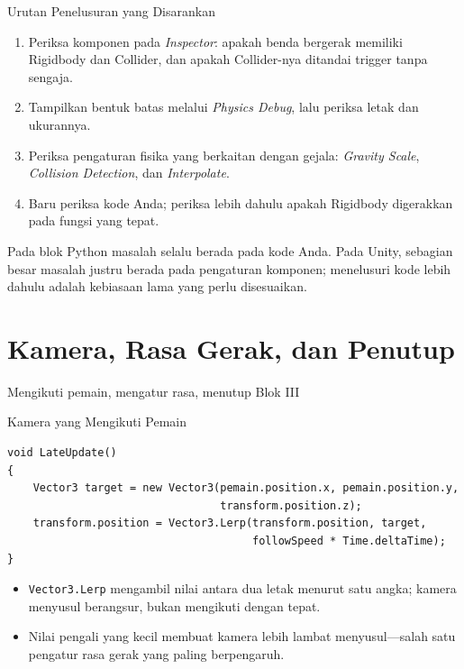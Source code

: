\documentclass[aspectratio=169,10pt]{beamer}
\begin{document}
\begin{frame}{Urutan Penelusuran yang Disarankan}
\begin{enumerate}
  \item Periksa komponen pada \emph{Inspector}: apakah benda bergerak memiliki
        Rigidbody dan Collider, dan apakah Collider-nya ditandai trigger tanpa
        sengaja.
  \item Tampilkan bentuk batas melalui \emph{Physics Debug}, lalu periksa letak
        dan ukurannya.
  \item Periksa pengaturan fisika yang berkaitan dengan gejala:
        \emph{Gravity Scale}, \emph{Collision Detection}, dan
        \emph{Interpolate}.
  \item Baru periksa kode Anda; periksa lebih dahulu apakah Rigidbody digerakkan
        pada fungsi yang tepat.
\end{enumerate}
\vspace{0.10cm}
\begin{peringatan}
Pada blok Python masalah selalu berada pada kode Anda. Pada Unity, sebagian
besar masalah justru berada pada pengaturan komponen; menelusuri kode lebih
dahulu adalah kebiasaan lama yang perlu disesuaikan.
\end{peringatan}
\end{frame}

\section{Kamera, Rasa Gerak, dan Penutup}
  {Mengikuti pemain, mengatur rasa, menutup Blok III}

\begin{frame}[fragile]{Kamera yang Mengikuti Pemain}
\begin{lstlisting}
void LateUpdate()
{
    Vector3 target = new Vector3(pemain.position.x, pemain.position.y,
                                 transform.position.z);
    transform.position = Vector3.Lerp(transform.position, target,
                                      followSpeed * Time.deltaTime);
}
\end{lstlisting}
\begin{itemize}
  \item \texttt{Vector3.Lerp} mengambil nilai antara dua letak menurut satu
        angka; kamera menyusul berangsur, bukan mengikuti dengan tepat.
  \item Nilai pengali yang kecil membuat kamera lebih lambat menyusul---salah
        satu pengatur rasa gerak yang paling berpengaruh.
\end{itemize}
\end{frame}
\end{document}

